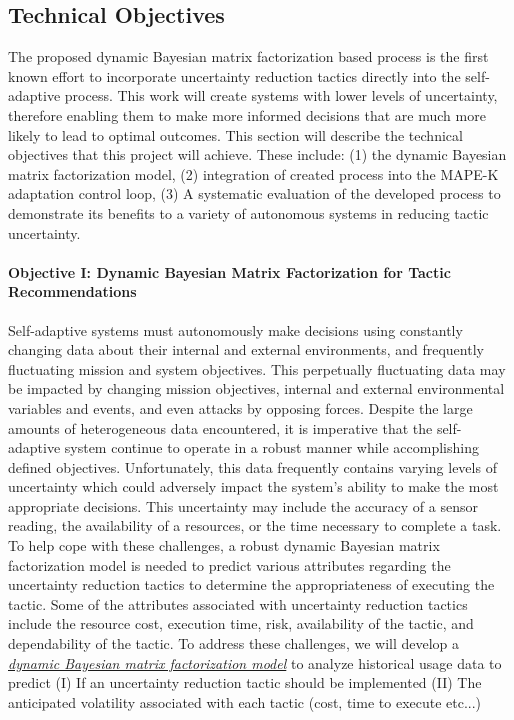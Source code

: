 \documentclass[12pt]{article}
\newcommand{\dan}[1]{\textcolor{blue}{{\it [Dan says: #1]}}}
\begin{document}
\subsection{Technical Objectives}
The proposed dynamic Bayesian matrix factorization based process is the first known effort to incorporate uncertainty reduction tactics directly into the self-adaptive process. This work will create systems with lower levels of uncertainty, therefore enabling them to make more informed decisions that are much more likely to lead to optimal outcomes. This section will describe the technical objectives that this project will achieve. These include: (1) the dynamic Bayesian matrix factorization model, (2) integration of created process into the MAPE-K adaptation control loop, (3) A systematic evaluation of the developed process to demonstrate its benefits to a variety of autonomous systems in reducing tactic uncertainty.

\vspace{-4mm}\paragraph{Objective I: Dynamic Bayesian Matrix Factorization for Tactic Recommendations} Self-adaptive systems must autonomously make decisions using constantly changing data about their internal and external environments, and frequently fluctuating mission and system objectives. This perpetually fluctuating data may be impacted by changing mission objectives, internal and external environmental variables and events, and even attacks by opposing forces. Despite the large amounts of heterogeneous data encountered, it is imperative that the self-adaptive system continue to operate in a robust manner while accomplishing defined objectives. Unfortunately, this data frequently contains varying levels of uncertainty which could adversely impact the system's ability to make the most appropriate decisions. This uncertainty may include the accuracy of a sensor reading, the availability of a resources, or the time necessary to complete a task. To help cope with these challenges, a robust dynamic Bayesian matrix factorization model is needed to predict various attributes regarding the uncertainty reduction tactics to determine the appropriateness of executing the tactic. Some of the attributes associated with uncertainty reduction tactics include the resource cost, execution time, risk, availability of the tactic, and dependability of the tactic. To address these challenges, we will develop a \ul{\em dynamic Bayesian matrix factorization model} to analyze historical usage data to predict (I) If an uncertainty reduction tactic should be implemented (II) The anticipated volatility associated with each tactic (cost, time to execute etc...) %
\end{document}
